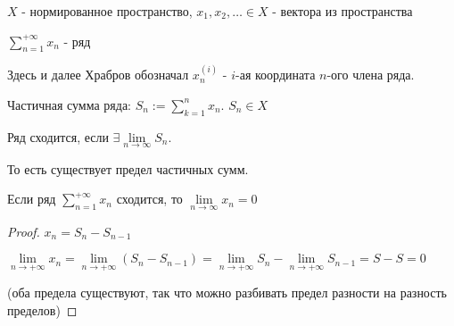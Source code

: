 
\begin{definition}
    $X$ - нормированное пространство, $x_1, x_2, \dots \in X$ - вектора из пространства

    $\sum\limits_{n=1}^{+\infty} x_n$ - ряд

    Здесь и далее Храбров обозначал $x_n^{(i)}$ - $i$-ая координата $n$-ого члена ряда.
\end{definition}


\begin{definition}

    Частичная сумма ряда: $S_n := \sum\limits_{k=1}^{n} x_n$. $S_n \in X$
\end{definition}

\begin{definition}

    Ряд сходится, если $\exists \lim\limits_{n \to \infty} S_n$.

    То есть существует предел частичных сумм.
\end{definition}

\begin{theorem}

    Если ряд $\sum\limits_{n=1}^{+\infty} x_n$ сходится, то $\lim\limits_{n \to \infty} x_n = 0$
\end{theorem}

\begin{proof}
    $x_n = S_n - S_{n-1}$

    $\lim\limits_{n \to +\infty} x_n = \lim\limits_{n \to +\infty} (S_n - S_{n-1}) = \lim\limits_{n \to +\infty} S_n - \lim\limits_{n \to +\infty} S_{n-1} = S - S = 0$

    (оба предела существуют, так что можно разбивать предел разности на разность пределов)

\end{proof}

